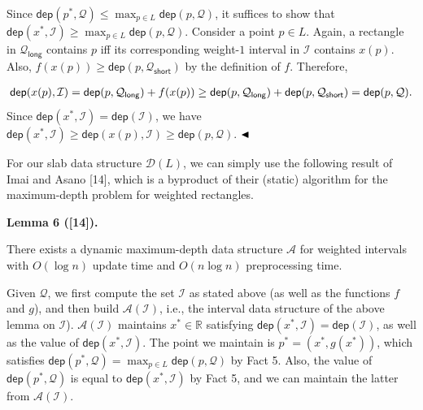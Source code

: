 \par
Since $\mathsf{dep}(p^{*},\mathcal{Q})\leq\max_{p\in L}{\mathsf{dep}}(p,\mathcal{Q})$, it suffices to show that $\mathsf{dep}(x^{*},\mathcal{I})\geq\max_{p\in L}{\mathsf{dep}}(p,\mathcal{Q})$. Consider a point $p\in L$. Again, a rectangle in $\mathcal{Q}_{\mathsf{long}}$ contains $p$ iff its corresponding weight-$1$ interval in $\mathcal{I}$ contains $x(p)$. Also, $f(x(p))\geq\mathsf{dep}(p,\mathcal{Q}_{\mathsf{short}})$ by the definition of $f$. Therefore,
\par
\[\begin{aligned}
{\mathsf{dep}}(x(p),\mathcal{I})=\mathsf{dep}(p,\mathcal{Q}_{\mathsf{long}})+f%
(x(p))\geq\mathsf{dep}(p,\mathcal{Q}_{\mathsf{long}})+\mathsf{dep}(p,\mathcal{%
Q}_{\mathsf{short}})=\mathsf{dep}(p,\mathcal{Q}).
\end{aligned}\]
Since $\mathsf{dep}(x^{*},\mathcal{I})=\mathsf{dep}(\mathcal{I})$, we have $\mathsf{dep}(x^{*},\mathcal{I})\geq{\mathsf{dep}}(x(p),\mathcal{I})\geq\mathsf%
{dep}(p,\mathcal{Q})$. $\hfill\blacktriangleleft$
\par
\par
For our slab data structure $\mathcal{D}(L)$, we can simply use the following result of Imai and Asano [14], which is a byproduct of their (static) algorithm for the maximum-depth problem for weighted rectangles.
\par
\par
\par\medskip\noindent\textbf{Lemma 6 ([14]).}\par
There exists a dynamic maximum-depth data structure $\mathcal{A}$ for weighted intervals with $O(\log n)$ update time and $O(n\log n)$ preprocessing time.
\par
\par
\par
Given $\mathcal{Q}$, we first compute the set $\mathcal{I}$ as stated above (as well as the functions $f$ and $g$), and then build $\mathcal{A}(\mathcal{I})$, i.e., the interval data structure of the above lemma on $\mathcal{I}$). $\mathcal{A}(\mathcal{I})$ maintains $x^{*}\in\mathbb{R}$ satisfying $\mathsf{dep}(x^{*},\mathcal{I})=\mathsf{dep}(\mathcal{I})$, as well as the value of $\mathsf{dep}(x^{*},\mathcal{I})$. The point we maintain is $p^{*}=(x^{*},g(x^{*}))$, which satisfies $\mathsf{dep}(p^{*},\mathcal{Q})=\max_{p\in L}{\mathsf{dep}}(p,\mathcal{Q})$ by Fact 5. Also, the value of $\mathsf{dep}(p^{*},\mathcal{Q})$ is equal to $\mathsf{dep}(x^{*},\mathcal{I})$ by Fact 5, and we can maintain the latter from $\mathcal{A}(\mathcal{I})$.
